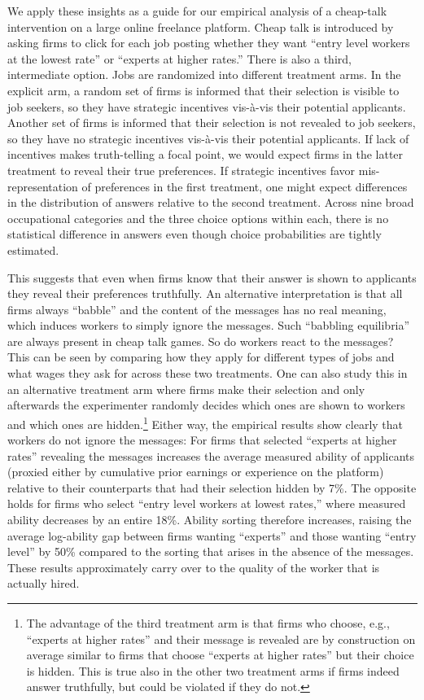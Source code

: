 \documentclass[12pt]{article}
\begin{document}
 
We apply these insights as a guide for our empirical analysis of a cheap-talk intervention on a large online freelance platform. Cheap talk is introduced by asking firms to click for each job posting whether they want ``entry level workers at the lowest rate'' or ``experts at higher rates.'' There is also a third, intermediate option. Jobs are randomized into different treatment arms. In the explicit arm, a random set of firms is informed that their selection is visible to job seekers, so they have strategic incentives vis-\`a-vis their potential applicants. Another set of firms is informed that their selection is not revealed to job seekers, so they have no strategic incentives vis-\`a-vis their potential applicants. If lack of incentives makes truth-telling a focal point, we would expect firms in the latter treatment to reveal their true preferences. If strategic incentives favor mis-representation of preferences in the first treatment, one might expect differences in the distribution of answers relative to the second treatment. Across nine broad occupational categories and the three choice options within each, there is no statistical difference in answers even though choice probabilities are tightly estimated. 

This suggests that even when firms know that their answer is shown to applicants they reveal their preferences truthfully. An alternative interpretation is that all firms always ``babble'' and the content of the messages has no real meaning, which induces workers to simply ignore the messages. Such ``babbling equilibria'' are always present in cheap talk games. So do workers react to the messages? This can be seen by comparing how they apply for different types of jobs and what wages they ask for across these two treatments. One can also study this in an alternative treatment arm where firms make their selection and only afterwards the experimenter randomly decides which ones are shown to workers and which ones are hidden.\footnote{The advantage of the third treatment arm is that firms who choose, e.g., ``experts at higher rates'' and their message is revealed are by construction on average similar to firms that choose ``experts at higher rates'' but their choice is hidden. This is true also in the other two treatment arms if firms indeed answer truthfully, but could be violated if they do not.} Either way, the empirical results show clearly that workers do not ignore the messages: For firms that selected ``experts at higher rates'' revealing the messages increases the average measured ability of applicants (proxied either by cumulative prior earnings or experience on the platform) relative to their counterparts that had their selection hidden by 7\%. The opposite holds for firms who select ``entry level workers at lowest rates,'' where measured ability decreases by an entire 18\%. Ability sorting therefore increases, raising the average log-ability gap between firms wanting ``experts'' and those wanting ``entry level'' by 50\% compared to the sorting that arises in the absence of the messages. These results approximately carry over to the quality of the worker that is actually hired.
\end{document}
